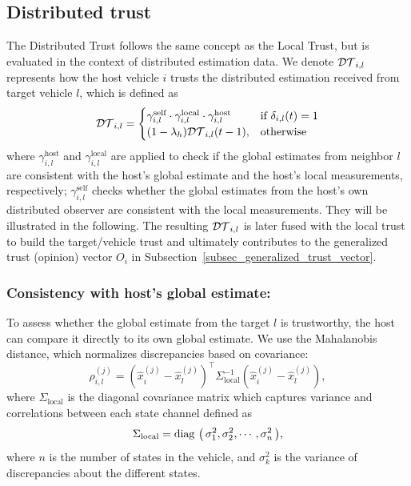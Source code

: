 

\subsection{Distributed trust}
\vspace*{-0.3cm}
The Distributed Trust follows the same concept as the Local Trust, but is evaluated in the context of distributed estimation data. We denote $\mathcal{DT}_{i,l}$ represents how the host vehicle $i$ trusts the distributed estimation received from target vehicle $l$, which is defined as
\begin{equation}
        \mathcal{DT}_{i,l}  = \begin{cases}
       \gamma_{i,l}^{\text{self}} \cdot \gamma_{i,l}^{\text{local}} \cdot
        \gamma_{i,l}^{\text{host}}   &  \text{if } \delta_{i,l}(t) = 1 \\
        (1 - \lambda_h)\mathcal{DT}_{i,l}(t-1), & \text{otherwise} \\
    \end{cases}
\end{equation}
where $\gamma_{i,l}^{\text{host}}$ and $\gamma_{i,l}^{\text{local}}$ are applied to check if the global estimates from neighbor $l$ are consistent with the host's global estimate and the host's local measurements, respectively;
$\gamma_{i,l}^{\text{self}}$ checks whether the global estimates from the host's own distributed observer are consistent with the local measurements.
They will be illustrated in the following. 
The resulting $\mathcal{DT}_{i,l}$ is later fused with the local trust to build the target/vehicle trust and ultimately contributes to the generalized trust (opinion) vector $O_i$ in Subsection~\ref{subsec_generalized_trust_vector}.


\subsubsection{Consistency with host's global estimate:}
To assess whether the global estimate from the target $l$ is trustworthy, the host can compare it directly to its own global estimate. 
We use the Mahalanobis distance, which normalizes discrepancies based on covariance:
\begin{equation}
    \rho_{i,l}^{(j)} = \left( \hat{x}_i^{(j)} - \hat{x}_l^{(j)} \right)^{\top} \Sigma_{\text{local}}^{-1} \left( \hat{x}_i^{(j)} - \hat{x}_l^{(j)} \right), 
    \label{eq_dis_glo}
\end{equation}
where $\Sigma_{\text{local}}$ is the diagonal covariance matrix  which captures variance and correlations between each state channel defined as 
\begin{equation}
\Sigma_{\text{local}} = \mathop{{\rm diag}\,\left(\,\sigma^2_1, \sigma^2_2, \cdots , \sigma^2_n\,\right)},
\end{equation}
where $n$ is the number of states in the vehicle, and $\sigma^2_k$ is  the variance of discrepancies about the different states. 

